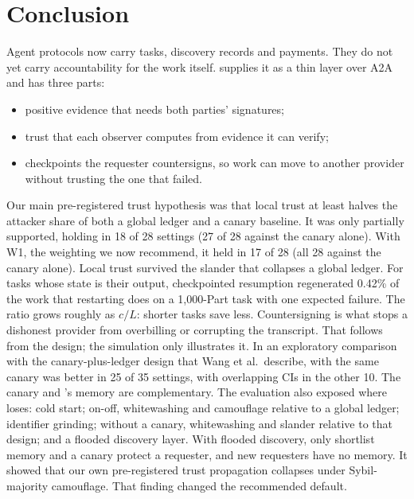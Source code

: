 \section{Conclusion}
\label{sec:conclusion}

Agent protocols now carry tasks, discovery records and payments. They do
not yet carry accountability for the work itself. \sys{} supplies it as a
thin layer over A2A and has three parts:
\begin{itemize}
\item positive evidence that needs both parties' signatures;
\item trust that each observer computes from evidence it can verify;
\item checkpoints the requester countersigns, so work can move to another
  provider without trusting the one that failed.
\end{itemize}

Our main pre-registered trust hypothesis was that local trust at least
halves the attacker share of both a global ledger and a canary baseline.
It was only partially supported, holding in 18 of 28 settings (27 of 28
against the canary alone). With W1, the weighting we now recommend, it
held in 17 of 28 (all 28 against the canary alone). Local trust survived the slander that
collapses a global ledger. For tasks whose state is their output,
checkpointed resumption regenerated 0.42\% of the work that restarting
does on a 1,000-Part task with one expected failure. The ratio grows
roughly as $c/L$: shorter tasks save less. Countersigning is what stops a dishonest provider from overbilling
or corrupting the transcript. That follows from the design; the
simulation only illustrates it. In an exploratory
comparison with the canary-plus-ledger design that Wang et al.\ describe,
\sys{} with the same canary was better in 25 of 35 settings, with
overlapping CIs in the other 10. The canary and \sys{}'s memory are
complementary. The evaluation also exposed where \sys{} loses: cold
start; on-off, whitewashing and camouflage relative to a global ledger;
identifier grinding; without a canary, whitewashing and slander relative
to that design; and a flooded discovery layer. With flooded discovery,
only shortlist memory and a canary protect a requester, and new
requesters have no memory. It showed that our own pre-registered trust
propagation collapses under Sybil-majority camouflage. That finding changed the
recommended default.

